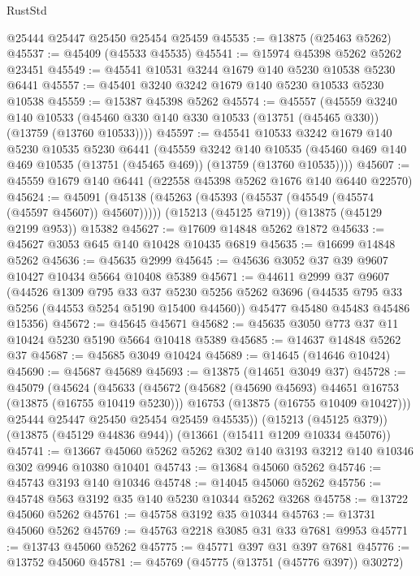 \begin{lexlean}{RustStd}
\begin{coremodule}
    @25444
    @25447
    @25450
    @25454
    @25459
@45535 := @13875 (@25463 @5262)
@45537 := @45409 (@45533 @45535)
@45541 := @15974 @45398 @5262 @5262 @23451
@45549 := @45541 @10531 @3244 @1679 @140 @5230 @10538 @5230 @6441
@45557 := @45401 @3240 @3242 @1679 @140 @5230 @10533 @5230 @10538
@45559 := @15387 @45398 @5262
@45574 := @45557
    (@45559
      @3240
      @140
      @10533
      (@45460 @330 @140 @330 @10533 (@13751 (@45465 @330)) (@13759 (@13760 @10533))))
@45597 := @45541
    @10533
    @3242
    @1679
    @140
    @5230
    @10535
    @5230
    @6441
    (@45559
      @3242
      @140
      @10535
      (@45460 @469 @140 @469 @10535 (@13751 (@45465 @469)) (@13759 (@13760 @10535))))
@45607 := @45559 @1679 @140 @6441 (@22558 @45398 @5262 @1676 @140 @6440 @22570)
@45624 := @45091
    (@45138 (@45263 (@45393 (@45537 (@45549 (@45574 (@45597 @45607)) @45607)))))
    (@15213 (@45125 @719))
    (@13875 (@45129 @2199 @953))
    @15382
@45627 := @17609 @14848 @5262 @1872
@45633 := @45627 @3053 @645 @140 @10428 @10435 @6819
@45635 := @16699 @14848 @5262
@45636 := @45635 @2999
@45645 := @45636 @3052 @37 @39 @9607 @10427 @10434 @5664 @10408 @5389
@45671 := @44611
    @2999
    @37
    @9607
    (@44526
      @1309
      @795
      @33
      @37
      @5230
      @5256
      @5262
      @3696
      (@44535 @795 @33 @5256 (@44553 @5254 @5190 @15400 @44560))
      @45477
      @45480
      @45483
      @45486
      @15356)
@45672 := @45645 @45671
@45682 := @45635 @3050 @773 @37 @11 @10424 @5230 @5190 @5664 @10418 @5389
@45685 := @14637 @14848 @5262 @37
@45687 := @45685 @3049 @10424
@45689 := @14645 (@14646 @10424)
@45690 := @45687 @45689
@45693 := @13875 (@14651 @3049 @37)
@45728 := @45079
    (@45624
      (@45633
        (@45672
          (@45682 (@45690 @45693) @44651 @16753 (@13875 (@16755 @10419 @5230)))
          @16753
          (@13875 (@16755 @10409 @10427)))
        @25444
        @25447
        @25450
        @25454
        @25459
        @45535))
    (@15213 (@45125 @379))
    (@13875 (@45129 @44836 @944))
    (@13661 (@15411 @1209 @10334 @45076))
@45741 := @13667 @45060 @5262 @5262 @302 @140 @3193 @3212 @140 @10346 @302 @9946 @10380 @10401
@45743 := @13684 @45060 @5262
@45746 := @45743 @3193 @140 @10346
@45748 := @14045 @45060 @5262
@45756 := @45748 @563 @3192 @35 @140 @5230 @10344 @5262 @3268
@45758 := @13722 @45060 @5262
@45761 := @45758 @3192 @35 @10344
@45763 := @13731 @45060 @5262
@45769 := @45763 @2218 @3085 @31 @33 @7681 @9953
@45771 := @13743 @45060 @5262
@45775 := @45771 @397 @31 @397 @7681
@45776 := @13752 @45060
@45781 := @45769 (@45775 (@13751 (@45776 @397)) @30272)

\end{coremodule}
\end{lexlean}

